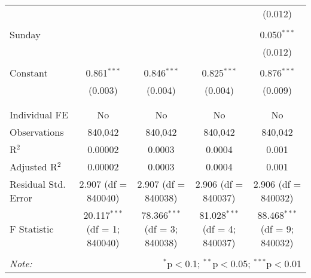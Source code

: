 \documentclass[
]{article}
\begin{document}
\begin{table}[!htbp]
{\begin{tabular}{@{\extracolsep{5pt}}lcccc}
  &  &  &  & (0.012) \\ 
  & & & & \\ 
 Sunday &  &  &  & 0.050$^{***}$ \\ 
  &  &  &  & (0.012) \\ 
  & & & & \\ 
 Constant & 0.861$^{***}$ & 0.846$^{***}$ & 0.825$^{***}$ & 0.876$^{***}$ \\ 
  & (0.003) & (0.004) & (0.004) & (0.009) \\ 
  & & & & \\ 
\hline \\[-1.8ex] 
Individual FE & No & No & No & No \\ 
Observations & 840,042 & 840,042 & 840,042 & 840,042 \\ 
R$^{2}$ & 0.00002 & 0.0003 & 0.0004 & 0.001 \\ 
Adjusted R$^{2}$ & 0.00002 & 0.0003 & 0.0004 & 0.001 \\ 
Residual Std. Error & 2.907 (df = 840040) & 2.907 (df = 840038) & 2.906 (df = 840037) & 2.906 (df = 840032) \\ 
F Statistic & 20.117$^{***}$ (df = 1; 840040) & 78.366$^{***}$ (df = 3; 840038) & 81.028$^{***}$ (df = 4; 840037) & 88.468$^{***}$ (df = 9; 840032) \\ 
\hline 
\hline \\[-1.8ex] 
\textit{Note:}  & \multicolumn{4}{r}{$^{*}$p$<$0.1; $^{**}$p$<$0.05; $^{***}$p$<$0.01} \\ 
\end{tabular}
} 
\end{table} 
\newpage
\end{document}
